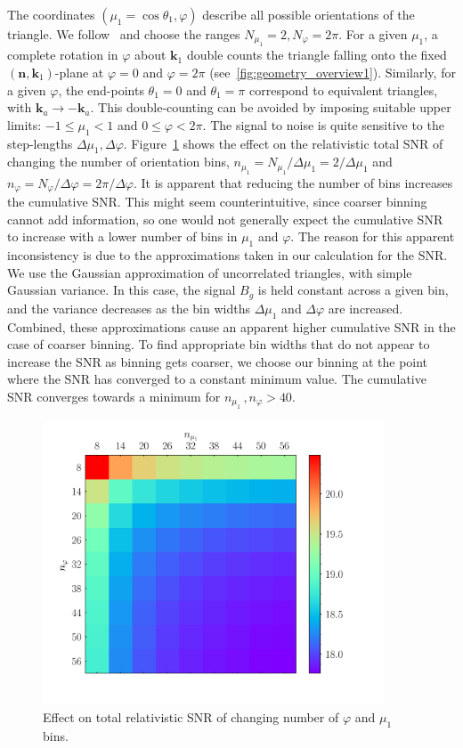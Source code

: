 The coordinates $(\mu_1=\cos\theta_{1},\varphi)$ describe all possible orientations of the triangle. 
We follow~\cite{Karagiannis:2018jdt} and choose the ranges $N_{\mu_1}=2, N_{\varphi}=2\pi$.
For a given $\mu_{1}$, a complete rotation in $\varphi$ about $\bm{k}_1$ double counts the  triangle falling onto the fixed $(\bm{n},\bm{k}_1)$-plane at $\varphi=0$ and $\varphi=2\pi$ (see~\ref{fig:geometry_overview1}). Similarly, for a given $\varphi$,  the end-points $\theta_1=0$ and $\theta_1=\pi$  correspond to equivalent triangles, with $\bm{k}_a \to - \bm{k}_a$.
This double-counting can be avoided by imposing suitable upper limits:
$-1\leq \mu_1 <1$ and $0\leq \varphi < 2\pi$.
The signal to noise is quite sensitive to the step-lengths $\Delta \mu_{1}, \Delta\varphi$. Figure~\ref{fig4x} shows the effect on the relativistic total SNR of changing the number of orientation bins, $n_{\mu_1}=N_{\mu_1}/\Delta{\mu_1}=2 /\Delta{\mu_1}$  and $n_\varphi=N_\varphi/\Delta\varphi =2\pi/\Delta\varphi$. It is apparent that reducing the number of bins increases the cumulative SNR. This might seem counterintuitive, since coarser binning cannot add information, so one would not generally expect the cumulative SNR to increase with a lower number of bins in $\mu_1$ and $\varphi$. The reason for this apparent inconsistency is due to the approximations taken in our calculation for the SNR. We use the Gaussian approximation of uncorrelated triangles, with simple Gaussian variance. In this case, the signal $B_g$ is held constant across a given bin, and the variance decreases as the bin widths $\Delta \mu_1$ and $\Delta \varphi$ are increased. Combined, these approximations cause an apparent higher cumulative SNR in the case of coarser binning. To find appropriate bin widths that do not appear to increase the SNR as binning gets coarser, we choose our binning at the point where the SNR has converged to a constant minimum value. The cumulative SNR converges towards a minimum for $n_{\mu_{1}}\,, n_{\varphi} > 40$.
\begin{figure}[!ht]
\centering
\includegraphics[width=0.9\textwidth]{fig/colournmu1nphi_Doppler-eps-converted-to} 
\caption{Effect on total relativistic SNR of changing number of  $\varphi$ and $\mu_1$ bins. 
} \label{fig4x}
\end{figure} 
